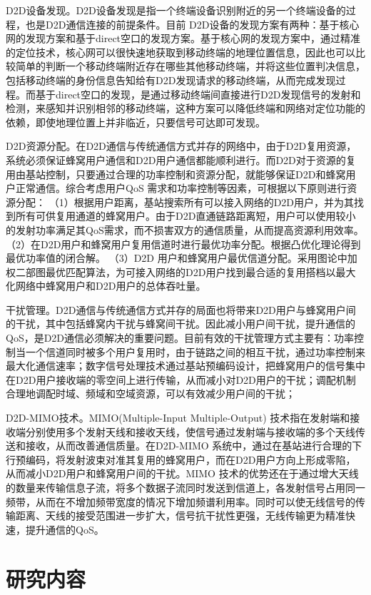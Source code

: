 \documentclass[figurelist,tablelist,algorithmlist,nomlist,masters]{seuthesix}
\begin{document}
	D2D设备发现。D2D设备发现是指一个终端设备识别附近的另一个终端设备的过程，也是D2D通信连接的前提条件。目前 D2D设备的发现方案有两种：基于核心网的发现方案和基于direct空口的发现方案。基于核心网的发现方案中，通过精准的定位技术，核心网可以很快速地获取到移动终端的地理位置信息，因此也可以比较简单的判断一个移动终端附近存在哪些其他移动终端，并将这些位置判决信息，包括移动终端的身份信息告知给有D2D发现请求的移动终端，从而完成发现过程。而基于direct空口的发现，是通过移动终端间直接进行D2D发现信号的发射和检测，来感知并识别相邻的移动终端，这种方案可以降低终端和网络对定位功能的依赖，即使地理位置上并非临近，只要信号可达即可发现。
	
	D2D资源分配。在D2D通信与传统通信方式并存的网络中，由于D2D复用资源，系统必须保证蜂窝用户通信和D2D用户通信都能顺利进行。而D2D对于资源的复用由基站控制，只要通过合理的功率控制和资源分配，就能够保证D2D和蜂窝用户正常通信。综合考虑用户QoS 需求和功率控制等因素，可根据以下原则进行资源分配：
	（1）根据用户距离，基站搜索所有可以接入网络的D2D用户，并为其找到所有可供复用通道的蜂窝用户。由于D2D直通链路距离短，用户可以使用较小的发射功率满足其QoS需求，而不损害双方的通信质量，从而提高资源利用效率。
	（2）在D2D用户和蜂窝用户复用信道时进行最优功率分配。根据凸优化理论得到最优功率值的闭合解。
	（3）D2D 用户和蜂窝用户最优信道分配。采用图论中加权二部图最优匹配算法，为可接入网络的D2D用户找到最合适的复用搭档以最大化网络中蜂窝用户和D2D用户的总体吞吐量。
	
	干扰管理。D2D通信与传统通信方式并存的局面也将带来D2D用户与蜂窝用户间的干扰，其中包括蜂窝内干扰与蜂窝间干扰。因此减小用户间干扰，提升通信的 QoS，是D2D通信必须解决的重要问题。目前有效的干扰管理方式主要有：功率控制当一个信道同时被多个用户复用时，由于链路之间的相互干扰，通过功率控制来最大化通信速率；数字信号处理技术通过基站预编码设计，把蜂窝用户的信号集中在D2D用户接收端的零空间上进行传输，从而减小对D2D用户的干扰；调配机制合理地调配时域、频域和空域资源，可以有效减少用户间的干扰；
	
	D2D-MIMO技术。MIMO(Multiple-Input Multiple-Output) 技术指在发射端和接收端分别使用多个发射天线和接收天线，使信号通过发射端与接收端的多个天线传送和接收，从而改善通信质量。在D2D-MIMO 系统中，通过在基站进行合理的下行预编码，将发射波束对准其复用的蜂窝用户，而在D2D用户方向上形成零陷，从而减小D2D用户和蜂窝用户间的干扰。MIMO 技术的优势还在于通过增大天线的数量来传输信息子流，将多个数据子流同时发送到信道上，各发射信号占用同一频带，从而在不增加频带宽度的情况下增加频谱利用率。同时可以使无线信号的传输距离、天线的接受范围进一步扩大，信号抗干扰性更强，无线传输更为精准快速，提升通信的QoS。
	
	
	\section{研究内容}
\end{document}
